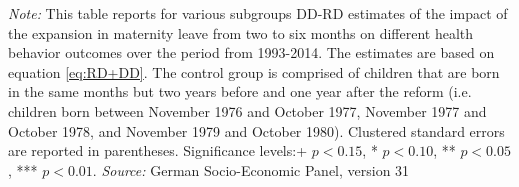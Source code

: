 \documentclass[a4paper ]{article}
\newlength\FHoffset
\begin{document}
\begin{table}[htp] \centering
\def\sym#1{\ifmmode^{#1}\else\(^{#1}\)\fi}
\caption{Heterogenity Analysis for Health Behavior, DD-RD Estimates}\label{tab:Heterog_HB}
\begin{minipage}{0.98\textwidth} %
{\footnotesize \textit{Note:} This table reports for various subgroups DD-RD estimates of the impact of the expansion in maternity leave from two to six months on different health behavior outcomes over the period from 1993-2014. The estimates are based on equation \ref{eq:RD+DD}. The control group is comprised of children that are born in the same months but two years before and one year after the reform (i.e. children born between November 1976 and October 1977, November 1977 and October 1978, and November 1979 and October 1980).\newline
Clustered standard errors are reported in parentheses. Significance levels:+ \(p<0.15\), * \(p<0.10\), ** \(p<0.05\), *** \(p<0.01\). \newline \textit{Source: }German Socio-Economic Panel, version 31\par}
\end{minipage}
\end{table}
\restoregeometry

\clearpage






\newpage
{}	
	
	
		\setlength\FHoffset{0cm} %
\fancyheadoffset{\FHoffset}



\end{document}
